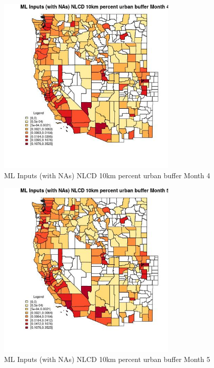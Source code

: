 \begin{figure} 
\centering  
\includegraphics[width=0.77\textwidth]{Code_Outputs/Report_ML_input_PM25_Step4_part_f_de_duplicated_aveswNAs_CountyNLCD_10km_percent_urban_buffermedianMonth4.jpg} 
\caption{\label{fig:Report_ML_input_PM25_Step4_part_f_de_duplicated_aveswNAsCountyNLCD_10km_percent_urban_buffermedianMonth4}ML Inputs (with NAs) NLCD 10km percent urban buffer Month 4} 
\end{figure} 
 

\begin{figure} 
\centering  
\includegraphics[width=0.77\textwidth]{Code_Outputs/Report_ML_input_PM25_Step4_part_f_de_duplicated_aveswNAs_CountyNLCD_10km_percent_urban_buffermedianMonth5.jpg} 
\caption{\label{fig:Report_ML_input_PM25_Step4_part_f_de_duplicated_aveswNAsCountyNLCD_10km_percent_urban_buffermedianMonth5}ML Inputs (with NAs) NLCD 10km percent urban buffer Month 5} 
\end{figure} 
 

